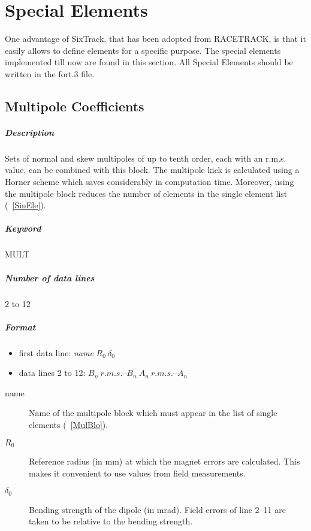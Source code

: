\documentclass[a4paper,11pt]{report}
\begin{document}
\section{Special Elements}

One advantage of SixTrack, that has been adopted from RACETRACK, is
that it easily allows to define elements for a specific purpose. The
special elements implemented till now are found in this section.
All Special Elements should be written in the fort.3 file.

\subsection{Multipole Coefficients} \label{MulCoe}

\subparagraph{Description}

Sets of normal and skew multipoles of up to tenth order, each with an
r.m.s. value, can be combined with this block. The multipole kick is
calculated using a Horner scheme which saves considerably in
computation time. Moreover, using the multipole block reduces the
number of elements in the single element list (~\ref{SinEle}).

\subparagraph{Keyword} MULT \subparagraph{Number of data lines} 2 to
12

\subparagraph{Format}
\begin{itemize}
\item first data line: {\em name} \/$ R_{0}\ \delta_{0} $
\item data lines 2 to 12: $ B_{n}\ r.m.s.$--$B_{n}\ A_{n}\ r.m.s.$--$A_{n} $
\end{itemize}

\begin{description}
\item [name] Name of the multipole block which must appear in the list
  of single elements (~\ref{MulBlo}).
\item [$ R_{0} $] Reference radius (in mm) at which the magnet errors
  are calculated.  This makes it convenient to use values from field
  measurements.
\item [$ \delta_{0} $] Bending strength of the dipole (in mrad). Field
  errors of line 2--11 are taken to be relative to the bending
  strength.
\end{description}
\end{document}
